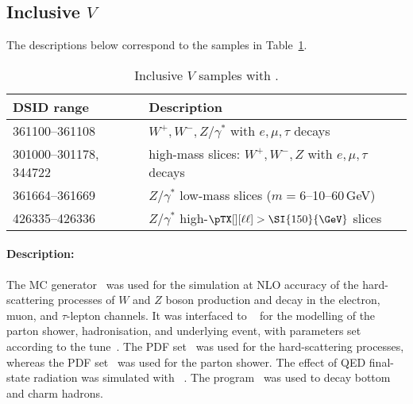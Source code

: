 \subsection[Inclusive Powheg $V$]{Inclusive \POWHEG $V$}

The descriptions below correspond to the samples in Table~\ref{tab:v-powheg}.

\begin{table}[!htbp]
  \caption{Inclusive $V$ samples with \POWHEG.}%
  \label{tab:v-powheg}
  \centering
  \begin{tabular}{l l}
    \toprule
    DSID range & Description \\
    \midrule
    361100--361108    & $W^+,W^-,Z/\gamma^\ast$ with $e,\mu,\tau$ decays\\
    301000--301178, 344722    & high-mass slices: $W^+,W^-,Z$ with $e,\mu,\tau$ decays \\
    361664--361669 & $Z/\gamma^\ast$ low-mass slices ($m=6$--10--60\,\si{\GeV})\\
    426335--426336 & $Z/\gamma^\ast$ high-$\pTX[][\ell\ell] > \SI{150}{\GeV}$ slices \\
    \bottomrule
  \end{tabular}
\end{table}

\paragraph{Description:}

The \POWHEGBOX[v1] MC generator~\cite{Nason:2004rx,Frixione:2007vw,Alioli:2010xd,Alioli:2008gx}
was used for the simulation at NLO accuracy of the hard-scattering processes of $W$
and $Z$ boson production and decay in the electron, muon, and $\tau$-lepton
channels. It was interfaced to \PYTHIA[8.186]~\cite{Sjostrand:2007gs}
for the modelling of the parton shower, hadronisation, and underlying
event, with parameters set according to the \AZNLO
tune~\cite{STDM-2012-23}. The \CT[10nlo] PDF set~\cite{Lai:2010vv} was used
for the hard-scattering processes, whereas the \CTEQ[6L1] PDF
set~\cite{Pumplin:2002vw} was used for the parton shower. The effect of
QED final-state radiation was simulated with \PHOTOSpp[3.52]~\cite{Golonka:2005pn,Davidson:2010ew}. 
The \EVTGEN[1.2.0] program~\cite{Lange:2001uf} was used to decay bottom and charm hadrons.


